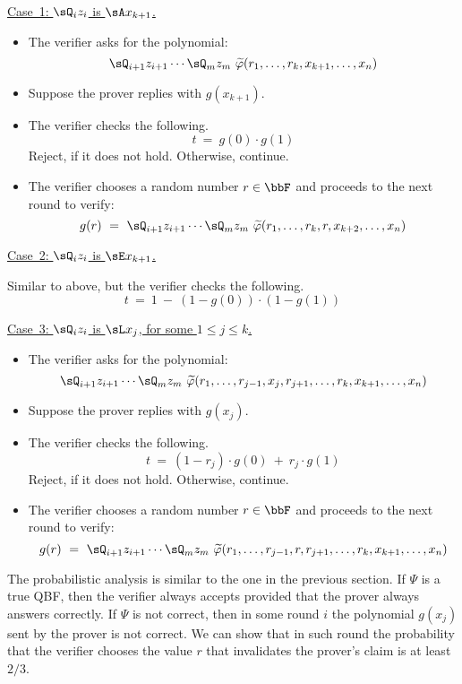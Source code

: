 \documentclass[11pt, a4paper]{article}
\begin{document}
\vspace{0.3cm}
\noindent
\underline{Case~1: $\sQ_i z_i$ is $\sA x_{k+1}$.}
\begin{itemize}
\item
The verifier asks for the polynomial:
$$
\sQ_{i+1} z_{i+1} \cdots \sQ_m z_m \ \widetilde{\varphi}(r_1,\ldots,r_k,x_{k+1},\ldots,x_n)
$$
\item 
Suppose the prover replies with $g(x_{k+1})$.

\item 
The verifier checks the following.
$$
t\  =\  g(0)\cdot g(1)
$$
Reject, if it does not hold. Otherwise, continue.

\item 
The verifier chooses a random number $r\in \bbF$
and proceeds to the next round to verify: 
$$
g(r) \ = \ \sQ_{i+1} z_{i+1} \cdots \sQ_m z_m \ \widetilde{\varphi}(r_1,\ldots,r_k,r,x_{k+2},\ldots,x_n)
$$
\end{itemize}

\noindent
\underline{Case~2:  $\sQ_i z_i$ is $\sE x_{k+1}$.}

Similar to above, but the verifier
checks the following.
$$
t\  =\  1\ -\ (1-g(0))\cdot (1-g(1))
$$

\vspace{0.3cm}
\noindent
\underline{Case~3: $\sQ_i z_i$ is $\sL x_j$, for some $1\leq j \leq k$.}

\begin{itemize}
\item
The verifier asks for the polynomial:
$$
\sQ_{i+1} z_{i+1} \cdots \sQ_m z_m \ \widetilde{\varphi}(r_1,\ldots,r_{j-1},x_j,r_{j+1},\ldots,r_k,x_{k+1},\ldots,x_n)
$$
\item 
Suppose the prover replies with $g(x_{j})$.
\item 
The verifier checks the following.
$$
t \ =\  (1-r_j)\cdot g(0)\ +\ r_j\cdot g(1)
$$
Reject, if it does not hold. Otherwise, continue.
\item 
The verifier chooses a random number $r\in \bbF$
and proceeds to the next round to verify: 
$$
g(r) \ = \ \sQ_{i+1} z_{i+1} \cdots \sQ_m z_m \ \widetilde{\varphi}(r_1,\ldots,r_{j-1},r,r_{j+1},\ldots,r_k,x_{k+1},\ldots,x_n)
$$
\end{itemize}

The probabilistic analysis is similar to the one in the previous section.
If $\Psi$ is a true QBF, then the verifier always accepts
provided that the prover always answers correctly.
If $\Psi$ is not correct, then in some round $i$
the polynomial $g(x_j)$ sent by the prover is not correct.
We can show that in such round the probability that the verifier chooses the value $r$ that 
invalidates the prover's claim is at least $2/3$.
\end{document}
